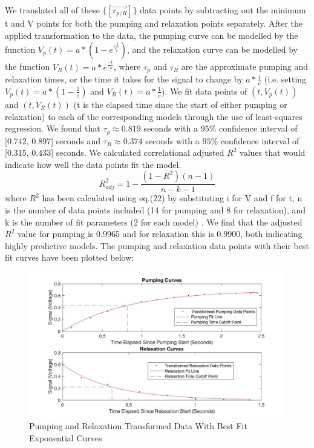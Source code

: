 \documentclass{article}
\begin{document}
We translated all of these $\{[\vec{r_{p/R}}]\}$ data points by subtracting out the minimum t and V points for both the pumping and relaxation points separately. After the applied transformation to the data, the pumping curve can be modelled by the function $V_p(t) = a*(1-e^{\frac{-t}{\tau_p}})$, and the relaxation curve can be modelled by the function $V_R(t) = a*e^{\frac{-t}{\tau_R}}$, where $\tau_p$ and $\tau_R$ are the approximate pumping and relaxation times, or the time it takes for the signal to change by $a*\frac{1}{e}$ (i.e. setting $V_p(t) = a*(1-\frac{1}{e})$ and $V_R(t) = a*\frac{1}{e}$). We fit data points of $(t,V_p(t))$ and $(t,V_R(t))$ (t is the elapsed time since the start of either pumping or relaxation) to each of the corresponding models through the use of least-squares regression. We found that $\tau_p \approx 0.819$ seconds with a $95\%$ confidence interval of [0.742, 0.897] seconds and $\tau_R \approx 0.374$ seconds with a $95\%$ confidence interval of [0.315, 0.433] seconds. We calculated correlational adjusted $R^2$ values that would indicate how well the data points fit the model.
\begin{equation}
      R_{adj}^2 = 1-\frac{(1-R^2)(n-1)}{n-k-1}
\end{equation}
where $R^2$ has been calculated using eq.(22) by substituting i for V and f for t, n is the number of data points included (14 for pumping and 8 for relaxation), and k is the number of fit parameters (2 for each model) \cite{stats}. We find that the adjusted $R^2$ value for pumping is 0.9965 and for relaxation this is 0.9900, both indicating highly predictive models. The pumping and relaxation data points with their best fit curves have been plotted below:
\begin{figure}[H] %
        \centering
        \includegraphics[scale = 0.25]{6.jpg}
        \caption{Pumping and Relaxation Transformed Data With Best Fit Exponential Curves}
        \label{fig:my_label}
    \end{figure}
\end{document}
